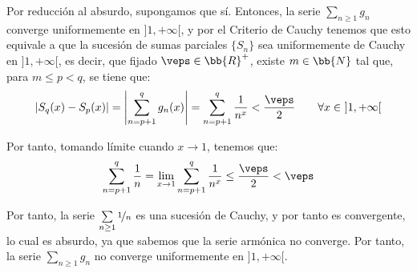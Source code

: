 \begin{ejercicio}
\begin{enumerate}
        Por reducción al absurdo, supongamos que sí.
        Entonces, la serie $\sum\limits_{n\geq 1}g_n$ converge uniformemente en $]1, +\infty[$, y por el Criterio de Cauchy tenemos que
        esto equivale a que la sucesión de sumas parciales $\{S_n\}$ sea uniformemente de Cauchy en $]1, +\infty[$, es decir, que fijado
        $\veps\in \bb{R}^+$, existe $m\in \bb{N}$ tal que, para $m\leq p < q$, se tiene que:
        \begin{equation*}
            |S_q(x) - S_p(x)| = \left|\sum_{n=p+1}^q g_n(x)\right| = \sum_{n=p+1}^q \frac{1}{n^x} < \frac{\veps}{2} \qquad \forall x\in~]1, +\infty[
        \end{equation*}

        Por tanto, tomando límite cuando $x\to 1$, tenemos que:
        \begin{equation*}
            \sum_{n=p+1}^q \frac{1}{n} = \lim_{x\to 1}\sum_{n=p+1}^q \frac{1}{n^x} \leq \frac{\veps}{2} < \veps
        \end{equation*}

        Por tanto, la serie $\sum\limits_{n\geq 1}\nicefrac{1}{n}$ es una sucesión de Cauchy, y por tanto es convergente, lo cual es absurdo, ya que sabemos que
        la serie armónica no converge. Por tanto, la serie $\sum\limits_{n\geq 1}g_n$ no converge uniformemente en $]1, +\infty[$.
    \end{enumerate}
\end{ejercicio}



